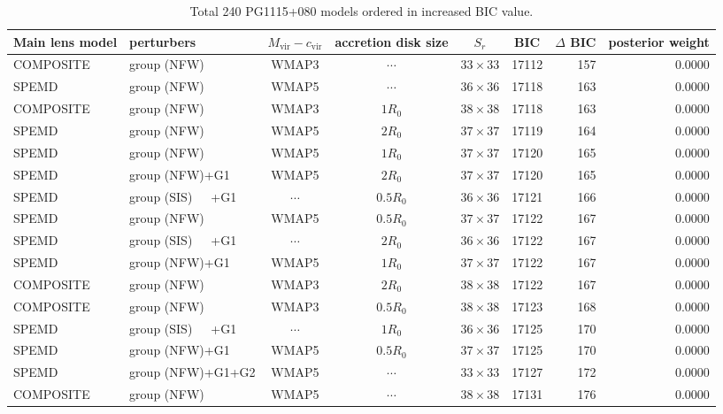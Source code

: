 \documentclass[useAMS,usenatbib]{mnras}
\def\nomicro{$\cdots$}
\def\nodata{$\cdots$}
\begin{document}
\begin{table}
    \centering
    \caption{Total 240 PG1115+080 models ordered in increased BIC value.}
    \label{tab:6TD}
    \begin{tabular}{llccccrr}
        \hline
        Main lens model & perturbers &$M_{\textrm{vir}}-c_{\textrm{vir}}$& accretion disk size & $S_{r}$ & BIC & $\Delta$ BIC & posterior weight\\
        \hline
        COMPOSITE & group (NFW)       &WMAP3 & \nomicro&$33\times33$ & 17112 & 157 & 0.0000\\
        SPEMD     & group (NFW)       &WMAP5 & \nomicro&$36\times36$ & 17118 & 163 & 0.0000\\
        COMPOSITE & group (NFW)       &WMAP3 & $1R_{0}$&$38\times38$ & 17118 & 163 & 0.0000\\
        SPEMD     & group (NFW)       &WMAP5 & $2R_{0}$&$37\times37$ & 17119 & 164 & 0.0000\\
        SPEMD     & group (NFW)       &WMAP5 & $1R_{0}$&$37\times37$ & 17120 & 165 & 0.0000\\
        SPEMD     & group (NFW)+G1    &WMAP5 & $2R_{0}$&$37\times37$ & 17120 & 165 & 0.0000\\
        SPEMD     & group (SIS)~~~+G1 &\nodata & $0.5R_{0}$&$36\times36$ & 17121 & 166 & 0.0000\\
        SPEMD     & group (NFW)       &WMAP5 & $0.5R_{0}$&$37\times37$ & 17122 & 167 & 0.0000\\
        SPEMD     & group (SIS)~~~+G1 &\nodata & $2R_{0}$&$36\times36$ & 17122 & 167 & 0.0000\\
        SPEMD     & group (NFW)+G1    &WMAP5 & $1R_{0}$&$37\times37$ & 17122 & 167 & 0.0000\\
        COMPOSITE & group (NFW)       &WMAP3 & $2R_{0}$&$38\times38$ & 17122 & 167 & 0.0000\\
        COMPOSITE & group (NFW)       &WMAP3 & $0.5R_{0}$&$38\times38$ & 17123 & 168 & 0.0000\\
        SPEMD     & group (SIS)~~~+G1 &\nodata& $1R_{0}$&$36\times36$ & 17125 & 170 & 0.0000\\
        SPEMD     & group (NFW)+G1    &WMAP5 & $0.5R_{0}$&$37\times37$ & 17125 & 170 & 0.0000\\
        SPEMD     & group (NFW)+G1+G2 &WMAP5 & \nomicro&$33\times33$ & 17127 & 172 & 0.0000\\
        COMPOSITE & group (NFW)       &WMAP5 & \nomicro&$38\times38$ & 17131 & 176 & 0.0000\\

\end{tabular}
\end{table}
\end{document}

